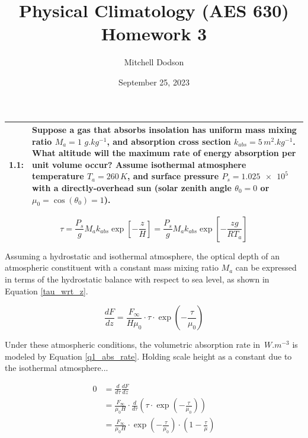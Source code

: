\documentclass[12pt]{article}
\title{Physical Climatology (AES 630) Homework 3}
\author{Mitchell Dodson}
\date{September 25, 2023}
\newcommand*{\problem}[2]{
    \begin{table}[ht]
    \centering
        \begin{tabular}{ | p{.1\linewidth} p{.9\linewidth} | }
            \hline
            \vspace{.3em}\textbf{\large#1:} & \vspace{.3em}\small{#2}\hspace{.2em}\vspace{.5em} \\ \hline
        \end{tabular}
    \end{table}
}
\begin{document}
\maketitle


\problem{1.1}{
    Suppose a gas that absorbs insolation has uniform mass mixing ratio $M_a = 1\,\,\si{g.kg^{-1}}$, and absorption cross section $k_{abs} = 5\,\si{m^2.kg^{-1}}$.
    What altitude will the maximum rate of energy absorption per unit volume occur? Assume isothermal atmosphere temperature $T_a = 260\,\si{K}$,
    and surface pressure $P_s=\num{1.025e5}$ with a directly-overhead sun (solar zenith angle $\theta_0 = 0$ or $\mu_0 = \cos\left(\theta_0\right) = 1$).
}

\begin{equation}\label{tau_wrt_z}
    \tau = \frac{P_s}{g} M_a k_{abs} \exp\left[-\frac{z}{H}\right]
    = \frac{P_s}{g} M_a k_{abs} \exp\left[-\frac{zg}{RT_a}\right]
\end{equation}


Assuming a hydrostatic and isothermal atmosphere, the optical depth of an atmospheric constituent with a constant mass mixing ratio $M_a$ can be expressed
in terms of the hydrostatic balance with respect to sea level, as shown in Equation \ref{tau_wrt_z}.

\begin{equation}\label{q1_abs_rate}
    \frac{dF}{dz} = \frac{F_\infty}{H \mu_0} \cdot \tau \cdot \exp\left(-\frac{\tau}{\mu_0}\right)
\end{equation}

Under these atmospheric conditions, the volumetric absorption rate in $\,\si{W.m^{-3}}$ is modeled by Equation \ref{q1_abs_rate}.
Holding scale height as a constant due to the isothermal atmosphere...

\begin{equation}\label{q1_rate_wrt_tau}
\begin{split}
    0 &= \frac{d}{d\tau} \frac{dF}{dz} \\
    &= \frac{F_{\infty}}{\mu_0 H} \cdot\frac{d}{d\tau} \left(\tau \cdot \exp\left(-\frac{\tau}{\mu_0}\right)\right) \\
    &= \frac{F_{\infty}}{\mu_0 H} \cdot \exp\left(-\frac{\tau}{\mu_0}\right)\cdot\left(1-\frac{\tau}{\mu}\right) \\
\end{split}
\end{equation}
\end{document}
